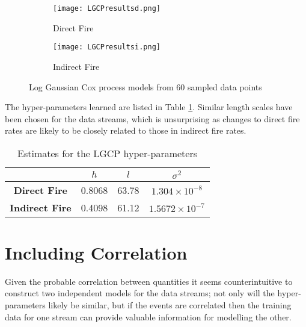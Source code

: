 \documentclass[a4paper,11pt]{report}
\begin{document}
\par
\begin{figure}
\centering
\begin{subfigure}{.5\textwidth}
	\centering
	\texttt{[image: LGCPresultsd.png]}
  	\caption{Direct Fire}
\end{subfigure}%
\begin{subfigure}{.5\textwidth}
  	\centering
  	\texttt{[image: LGCPresultsi.png]}
  	\caption{Indirect Fire}
\end{subfigure}
\caption{Log Gaussian Cox process models from 60 sampled data points}
\label{fig:LGCPresults}
\end{figure}

The hyper-parameters learned are listed in Table \ref{LGCPhyperparameters}. Similar length scales have been chosen for the data streams, which is unsurprising as changes to direct fire rates are likely to be closely related to those in indirect fire rates. 


\singlespacing
\begin{table}[]
\centering
\caption{Estimates for the LGCP hyper-parameters}
\label{LGCPhyperparameters}
\begin{tabular}{c|c|c|c|}
\cline{2-4}
\textbf{}                                    & \(h\) & \(l\) & \(\sigma^2\) \\ \hline
\multicolumn{1}{|c|}{\textbf{Direct Fire}}   & 0.8068          & 63.78          & \(1.304\times 10^{-8}\)              \\ \hline
\multicolumn{1}{|c|}{\textbf{Indirect Fire}} & 0.4098          & 61.12          & \(1.5672\times 10^{-7}\)              \\ \hline
\end{tabular}
\end{table}
\doublespacing

\section{Including Correlation}


Given the probable correlation between quantities it seems counterintuitive to construct two independent models for the data streams; not only will the hyper-parameters likely be similar, but if the events are correlated then the training data for one stream can provide valuable information for modelling the other.\par
\end{document}
